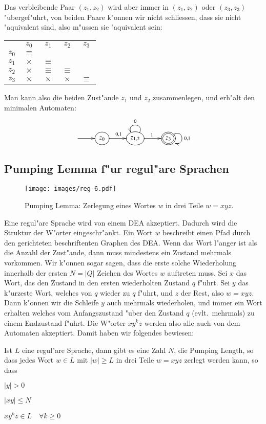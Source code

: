 Das verbleibende Paar $(z_1,z_2)$ wird aber immer in $(z_1,z_2)$ 
oder $(z_3,z_3)$ "ubergef"uhrt, von beiden Paare k"onnen wir nicht
schliessen, dass sie nicht "aquivalent sind, also m"ussen sie "aquivalent
sein:
\begin{center}
\begin{tabular}{ccccc}
     &$z_0$   &$z_1$   &$z_2$   &$z_3$   \\
$z_0$&$\equiv$&        &        &        \\
$z_1$&$\times$&$\equiv$&        &        \\
$z_2$&$\times$&$\equiv$&$\equiv$&        \\
$z_3$&$\times$&$\times$&$\times$&$\equiv$
\end{tabular}
\end{center}
Man kann also die beiden Zust"ande $z_1$ und $z_2$ zusammenlegen,
und erh"alt den minimalen Automaten:
\[
\entrymodifiers={++[o][F]}
\xymatrix{
*+\txt{} \ar[r]
	&{z_0}\ar[r]^{0,1} 
		&{z_{1,2}}\ar@(ur,ul)_{0}\ar[r]^1
			&*++[o][F=]{z_3}\ar@(ur,dr)^{0,1}
}
\]
\subsection{Pumping Lemma f"ur regul"are Sprachen\label{regulaer:pumpinglemma}}
\begin{figure}
\begin{center}
\texttt{[image: images/reg-6.pdf]}
\end{center}
\caption{Pumping Lemma: Zerlegung eines Wortes $w$ in drei Teile
$w=xyz$.\label{regular:pumpinglemma-graph}}
\end{figure}
Eine regul"are Sprache wird von einem DEA akzeptiert. Dadurch wird
die Struktur der W"orter eingeschr"ankt. Ein Wort $w$ beschreibt
einen Pfad durch den gerichteten beschriftenten Graphen des DEA.
Wenn das Wort l"anger ist als die Anzahl der Zust"ande, dann muss
mindestens ein Zustand mehrmals vorkommen. Wir k"onnen sogar
sagen, dass die erste solche Wiederholung innerhalb der ersten
$N = |Q|$ Zeichen des Wortes $w$ auftreten muss. Sei $x$ das Wort,
das den Zustand in den ersten wiederholten Zustand $q$ f"uhrt.
Sei $y$ das k"urzeste Wort, welches von $q$ wieder zu $q$ f"uhrt, und
$z$ der Rest, also $w=xyz$. Dann k"onnen wir die Schleife $y$
auch mehrmals wiederholen, und immer ein Wort erhalten welches
vom Anfangszustand "uber den Zustand $q$ (evlt.~mehrmals) zu einem
Endzustand f"uhrt. Die W"orter $xy^kz$ werden also alle auch von
dem Automaten akzeptiert. Damit haben wir folgendes bewiesen:
\begin{satz}
Ist $L$ eine regul"are Sprache, dann gibt es eine Zahl $N$, die Pumping Length, so dass
jedes Wort $w\in L$ mit $|w|\ge L$ in drei Teile
$w=xyz$ zerlegt werden kann, so dass
\begin{compactenum}
\item $|y| > 0$
\item $|xy|\le N$
\item $xy^kz\in L\quad\forall k\ge 0$
\end{compactenum}
\end{satz}

